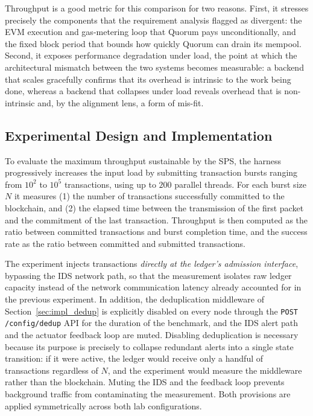 Throughput is a good metric for this comparison for two reasons. First, it stresses precisely the components that the requirement analysis flagged as divergent: the EVM execution and gas-metering loop that Quorum pays unconditionally, and the fixed block period that bounds how quickly Quorum can drain its mempool. Second, it exposes performance degradation under load, the point at which the architectural mismatch between the two systems becomes measurable: a backend that scales gracefully confirms that its overhead is intrinsic to the work being done, whereas a backend that collapses under load reveals overhead that is non-intrinsic and, by the alignment lens, a form of mis-fit.

\subsection{Experimental Design and Implementation}
\label{subsec:exp_throughput_design}

To evaluate the maximum throughput sustainable by the SPS, the harness progressively increases the input load by submitting transaction bursts ranging from $10^2$ to $10^5$ transactions, using up to $200$ parallel threads. For each burst size $N$ it measures (1) the number of transactions successfully committed to the blockchain, and (2) the elapsed time between the transmission of the first packet and the commitment of the last transaction. Throughput is then computed as the ratio between committed transactions and burst completion time, and the success rate as the ratio between committed and submitted transactions.

The experiment injects transactions \emph{directly at the ledger's admission interface}, bypassing the IDS network path, so that the measurement isolates raw ledger capacity instead of the network communication latency already accounted for in the previous experiment. In addition, the deduplication middleware of Section~\ref{sec:impl_dedup} is explicitly disabled on every node through the \texttt{POST /config/dedup} API for the duration of the benchmark, and the IDS alert path and the actuator feedback loop are muted. Disabling deduplication is necessary because its purpose is precisely to collapse redundant alerts into a single state transition: if it were active, the ledger would receive only a handful of transactions regardless of $N$, and the experiment would measure the middleware rather than the blockchain. Muting the IDS and the feedback loop prevents background traffic from contaminating the measurement. Both provisions are applied symmetrically across both lab configurations.

